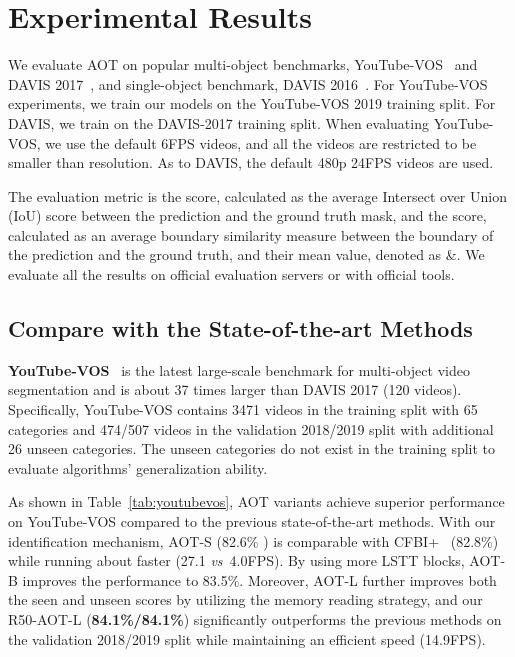 \documentclass{article}
\def\vs{\emph{vs}~}
\begin{document}
 \section{Experimental Results}\label{sec:experiments}
We evaluate AOT on popular multi-object benchmarks, YouTube-VOS~\cite{youtubevos} and DAVIS 2017~\cite{davis2017}, and single-object benchmark, DAVIS 2016~\cite{davis2016}. For YouTube-VOS experiments, we train our models on the YouTube-VOS 2019 training split. For DAVIS, we train on the DAVIS-2017 training split. When evaluating YouTube-VOS, we use the default 6FPS videos, and all the videos are restricted to be smaller than  resolution. As to DAVIS, the default 480p 24FPS videos are used.

The evaluation metric is the  score, calculated as the average Intersect over Union (IoU) score between the prediction and the ground truth mask, and the  score, calculated as an average boundary similarity measure between the boundary of the prediction and the ground truth, and their mean value, denoted as \&. We evaluate all the results on official evaluation servers or with official tools.
\subsection{Compare with the State-of-the-art Methods}


\noindent \textbf{YouTube-VOS}~\cite{youtubevos} is the latest large-scale benchmark for multi-object video segmentation and is about 37 times larger than DAVIS 2017 (120 videos). Specifically, YouTube-VOS contains 3471 videos in the training split with 65 categories and 474/507 videos in the validation 2018/2019 split with additional 26 unseen categories. The unseen categories do not exist in the training split to evaluate algorithms' generalization ability.

As shown in Table~\ref{tab:youtubevos}, AOT variants achieve superior performance on YouTube-VOS compared to the previous state-of-the-art methods. With our identification mechanism, AOT-S (82.6\% ) is comparable with CFBI+~\cite{cfbip} (82.8\%) while running about  faster (27.1 \vs 4.0FPS). By using more LSTT blocks, AOT-B improves the performance to 83.5\%. Moreover, AOT-L further improves both the seen and unseen scores by utilizing the memory reading strategy, and our R50-AOT-L (\textbf{84.1\%/84.1\%}) significantly outperforms the previous methods on the validation 2018/2019 split while maintaining an efficient speed (14.9FPS).
\end{document}
